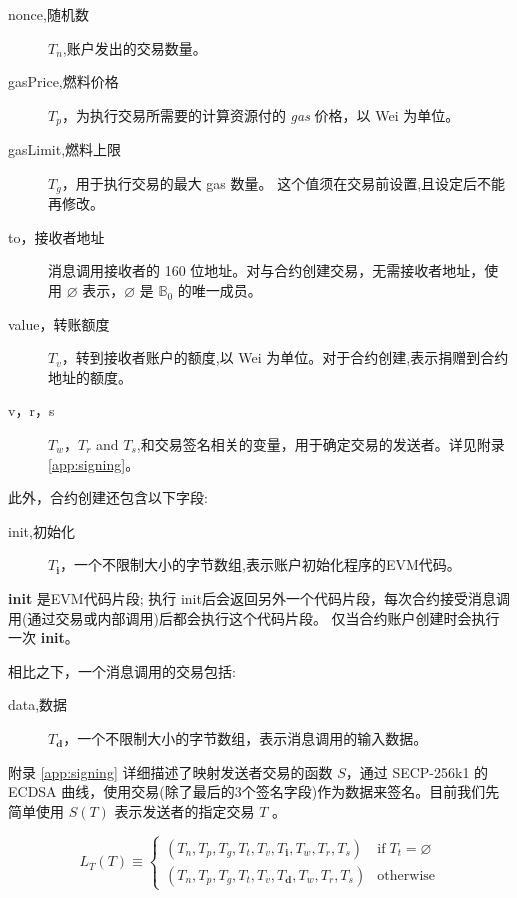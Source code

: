 \documentclass[9pt,oneside]{amsart}
\begin{document}
\begin{multicols}{2}
\begin{description}
\item[nonce,随机数] $T_n$,账户发出的交易数量。
\item[gasPrice,燃料价格] $T_p$，为执行交易所需要的计算资源付的 \textit{gas} 价格，以 Wei 为单位。
\item[gasLimit,燃料上限] $T_g$，用于执行交易的最大 gas 数量。 这个值须在交易前设置,且设定后不能再修改。
\item[to，接收者地址] 消息调用接收者的 160 位地址。对与合约创建交易，无需接收者地址，使用 $\varnothing$ 表示，$\varnothing$ 是 $\mathbb{B}_0$ 的唯一成员。
\item[value，转账额度] $T_v$，转到接收者账户的额度,以 Wei 为单位。对于合约创建,表示捐赠到合约地址的额度。
\item[v，r，s] $T_w$，$T_r$ and $T_s$,和交易签名相关的变量，用于确定交易的发送者。详见附录 \ref{app:signing}。
\end{description}

此外，合约创建还包含以下字段:

\begin{description}
\item[init,初始化] $T_\mathbf{i}$，一个不限制大小的字节数组,表示账户初始化程序的EVM代码。
\end{description}

\textbf{init} 是EVM代码片段; 执行 init后会返回另外一个代码片段，每次合约接受消息调用(通过交易或内部调用)后都会执行这个代码片段。 仅当合约账户创建时会执行一次 \textbf{init}。

相比之下，一个消息调用的交易包括:

\begin{description}
\item[data,数据] $T_\mathbf{d}$，一个不限制大小的字节数组，表示消息调用的输入数据。
\end{description}

附录 \ref{app:signing} 详细描述了映射发送者交易的函数 $S$，通过 SECP-256k1 的 ECDSA 曲线，使用交易(除了最后的3个签名字段)作为数据来签名。目前我们先简单使用 $S(T)$ 表示发送者的指定交易 $T$ 。

\begin{equation}
L_T(T) \equiv \begin{cases}
(T_n, T_p, T_g, T_t, T_v, T_\mathbf{i}, T_w, T_r, T_s) & \text{if} \; T_t = \varnothing\\
(T_n, T_p, T_g, T_t, T_v, T_\mathbf{d}, T_w, T_r, T_s) & \text{otherwise}
\end{cases}
\end{equation}


\end{multicols}
\end{document}
